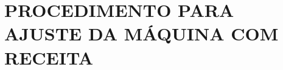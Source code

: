 \ifmachineType
\else
  \newpage
  \thispagestyle{fancy}
  \vspace*{40 pt}
\fi

\section{\large{PROCEDIMENTO PARA AJUSTE DA MÁQUINA COM RECEITA}}


\begin{procedureAdjustmentRecipe}
  

\end{procedureAdjustmentRecipe}
